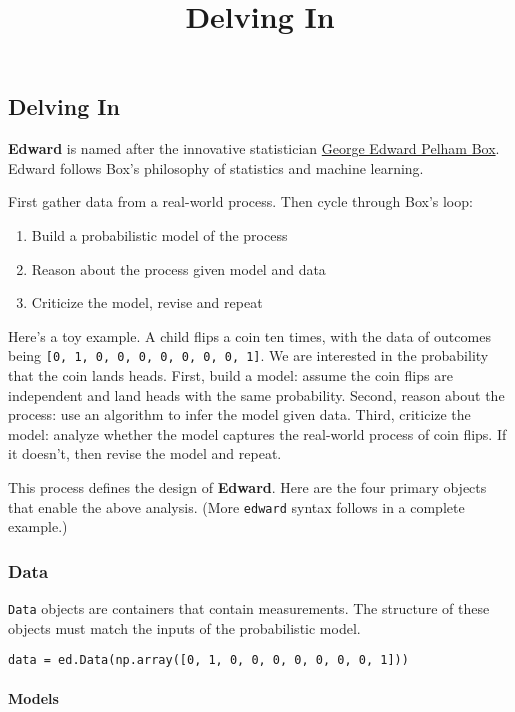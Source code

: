 \title{Delving In}

\subsection{Delving In}
\textbf{Edward} is named after the innovative statistician
\href{https://en.wikipedia.org/wiki/George_E._P._Box}{George Edward
Pelham Box}. Edward follows Box's philosophy of statistics and machine
learning.

First gather data from a real-world process. Then cycle through Box's
loop:

\begin{enumerate}
\item Build a probabilistic model of the process
\item Reason about the process given model and data
\item Criticize the model, revise and repeat
\end{enumerate}

Here's a toy example. A child flips a coin ten times, with the data of
outcomes being \texttt{{[}0,\ 1,\ 0,\ 0,\ 0,\ 0,\ 0,\ 0,\ 0,\ 1{]}}. We
are interested in the probability that the coin lands heads. First,
build a model: assume the coin flips are independent and land heads with
the same probability. Second, reason about the process: use an algorithm
to infer the model given data. Third, criticize the model: analyze
whether the model captures the real-world process of coin flips. If it
doesn't, then revise the model and repeat.

This process defines the design of \textbf{Edward}. Here are the four
primary objects that enable the above analysis. (More \texttt{edward}
syntax follows in a complete example.)

\subsubsection{Data}

\texttt{Data} objects are containers that contain measurements. The
structure of these objects must match the inputs of the probabilistic
model.

\begin{verbatim}
data = ed.Data(np.array([0, 1, 0, 0, 0, 0, 0, 0, 0, 1]))
\end{verbatim}

\paragraph{Models}\label{models}

